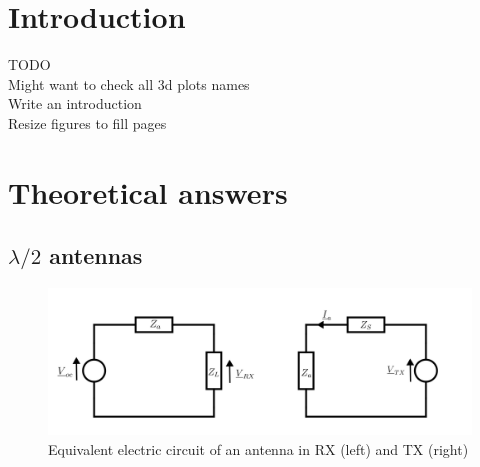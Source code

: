 \documentclass[10pt,a4paper]{ULBreport}
\begin{document}
 





\chapter{Introduction}

\begin{center}
    
    \Huge TODO\\
    \vspace{0.5cm}
    \large Might want to check all 3d plots names\\
    Write an introduction\\
    Resize figures to fill pages
    \normalsize
    
\end{center}
\chapter{Theoretical answers}

\section{$\lambda/2$ antennas}

\begin{figure}[H]
    \centering
    \includegraphics[width=1\textwidth]{circuit.png}
    \caption{Equivalent electric circuit of an antenna in RX (left) and TX (right)}
    \label{fig:equivalent_electrical_circuit}
\end{figure}
\end{document}
